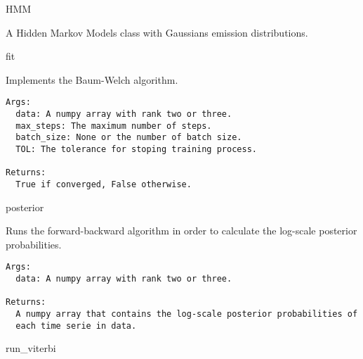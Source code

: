 HMM

\begin{Shaded}
\begin{Highlighting}[]
\end{Highlighting}
\end{Shaded}

A Hidden Markov Models class with Gaussians emission distributions.

fit

\begin{Shaded}
\begin{Highlighting}[]
\OperatorTok{=}\OperatorTok{=}\OperatorTok{=}\OperatorTok{=}\OperatorTok{=}\NormalTok{)}
\end{Highlighting}
\end{Shaded}

Implements the Baum-Welch algorithm.

\begin{verbatim}
Args:
  data: A numpy array with rank two or three.
  max_steps: The maximum number of steps.
  batch_size: None or the number of batch size.
  TOL: The tolerance for stoping training process.

Returns:
  True if converged, False otherwise.
\end{verbatim}

posterior

\begin{Shaded}
\begin{Highlighting}[]
\end{Highlighting}
\end{Shaded}

Runs the forward-backward algorithm in order to calculate the log-scale
posterior probabilities.

\begin{verbatim}
Args:
  data: A numpy array with rank two or three.

Returns:
  A numpy array that contains the log-scale posterior probabilities of
  each time serie in data.
\end{verbatim}

run\_viterbi

\begin{Shaded}
\begin{Highlighting}[]
\end{Highlighting}
\end{Shaded}

